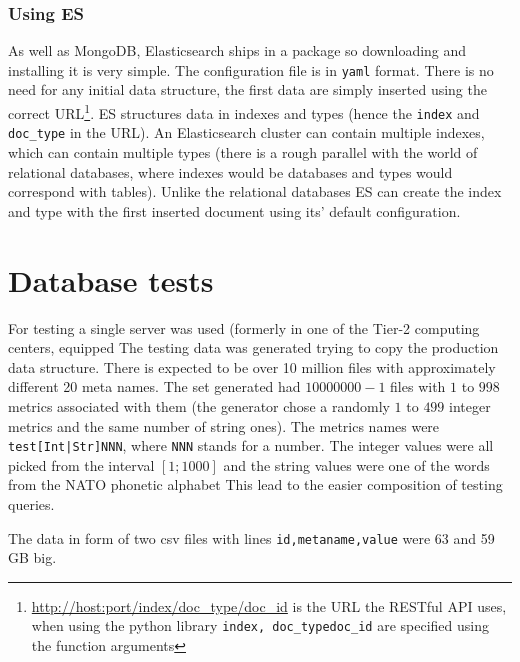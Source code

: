\subsubsection{Using ES}

As well as MongoDB, Elasticsearch ships in a package so downloading and installing it is very simple. The 
configuration file is in \texttt{yaml} format. There is no need for any initial data structure,
the first data are simply inserted using the correct URL\footnote{\url{http://host:port/index/doc_type/doc_id}
is the URL the RESTful API uses, when using the python library \texttt{index, doc\_type}\texttt{doc\_id} are 
specified using the function arguments}. ES structures data in indexes and types (hence the \texttt{index} and
\texttt{doc\_type} in the URL). An Elasticsearch cluster can contain multiple indexes, which can contain multiple
types (there is a rough parallel with the world of relational databases, where indexes would be databases and
types would correspond with tables). Unlike the relational databases ES can create the index and type with the 
first inserted document using its' default configuration.


\section{Database tests}

For testing a single server was used (formerly in one of the Tier-2 computing centers, equipped
The testing data was generated trying to copy the production data structure. There is expected to
be over 10 million files with approximately different 20 meta names. %
The set generated had $10 000 000 - 1$ files with $1$ to $998$ metrics associated with them 
(the generator chose a randomly $1$ to $499$ integer metrics and the same number of string ones).
The metrics names were \texttt{test[Int|Str]NNN}, where \texttt{NNN} stands for a number. The
integer values were all picked from the interval $[1;1000]$ and the string values were one of the
words from the NATO phonetic alphabet %
This lead to the easier composition of testing queries.

The data in form of two csv files with lines \texttt{id,metaname,value} were 63 and 59 GB big.

